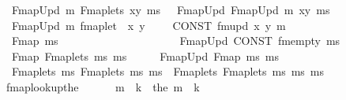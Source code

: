 \begin{isabellebody}
\isanewline
{}\isamarkupfalse%
\isanewline
\ \ {\isachardoublequoteopen}{\isacharunderscore}{\kern0pt}FmapUpd\ m\ {\isacharparenleft}{\kern0pt}{\isacharunderscore}{\kern0pt}Fmaplets\ xy\ ms{\isacharparenright}{\kern0pt}{\isachardoublequoteclose}\ \ {\isasymrightleftharpoons}\ {\isachardoublequoteopen}{\isacharunderscore}{\kern0pt}FmapUpd\ {\isacharparenleft}{\kern0pt}{\isacharunderscore}{\kern0pt}FmapUpd\ m\ xy{\isacharparenright}{\kern0pt}\ ms{\isachardoublequoteclose}\isanewline
\ \ {\isachardoublequoteopen}{\isacharunderscore}{\kern0pt}FmapUpd\ m\ {\isacharparenleft}{\kern0pt}{\isacharunderscore}{\kern0pt}fmaplet\ \ x\ y{\isacharparenright}{\kern0pt}{\isachardoublequoteclose}\ \ \ \ {\isasymrightleftharpoons}\ {\isachardoublequoteopen}CONST\ fmupd\ x\ y\ m{\isachardoublequoteclose}\isanewline
\ \ {\isachardoublequoteopen}{\isacharunderscore}{\kern0pt}Fmap\ ms{\isachardoublequoteclose}\ \ \ \ \ \ \ \ \ \ \ \ \ \ \ \ \ \ \ \ \ {\isasymrightleftharpoons}\ {\isachardoublequoteopen}{\isacharunderscore}{\kern0pt}FmapUpd\ {\isacharparenleft}{\kern0pt}CONST\ fmempty{\isacharparenright}{\kern0pt}\ ms{\isachardoublequoteclose}\isanewline
\ \ {\isachardoublequoteopen}{\isacharunderscore}{\kern0pt}Fmap\ {\isacharparenleft}{\kern0pt}{\isacharunderscore}{\kern0pt}Fmaplets\ ms{}\ ms{}{\isacharparenright}{\kern0pt}{\isachardoublequoteclose}\ \ \ \ \ {\isasymleftharpoondown}\ {\isachardoublequoteopen}{\isacharunderscore}{\kern0pt}FmapUpd\ {\isacharparenleft}{\kern0pt}{\isacharunderscore}{\kern0pt}Fmap\ ms{}{\isacharparenright}{\kern0pt}\ ms{}{\isachardoublequoteclose}\isanewline
\ \ {\isachardoublequoteopen}{\isacharunderscore}{\kern0pt}Fmaplets\ ms{}\ {\isacharparenleft}{\kern0pt}{\isacharunderscore}{\kern0pt}Fmaplets\ ms{}\ ms{}{\isacharparenright}{\kern0pt}{\isachardoublequoteclose}\ {\isasymleftharpoondown}\ {\isachardoublequoteopen}{\isacharunderscore}{\kern0pt}Fmaplets\ {\isacharparenleft}{\kern0pt}{\isacharunderscore}{\kern0pt}Fmaplets\ ms{}\ ms{}{\isacharparenright}{\kern0pt}\ ms{}{\isachardoublequoteclose}\isanewline
\isanewline
{}\isamarkupfalse%
\ fmap{\isacharunderscore}{\kern0pt}lookup{\isacharunderscore}{\kern0pt}the\ {\isacharparenleft}{\kern0pt}\ {\isacartoucheopen}{\isachardollar}{\kern0pt}{\isachardollar}{\kern0pt}{\isacharbang}{\kern0pt}{\isacartoucheclose}\ {}{}{}{\isacharparenright}{\kern0pt}\ \isanewline
\ \ {\isachardoublequoteopen}m\ {\isachardollar}{\kern0pt}{\isachardollar}{\kern0pt}{\isacharbang}{\kern0pt}\ k\ {\isasymequiv}\ the\ {\isacharparenleft}{\kern0pt}m\ {\isachardollar}{\kern0pt}{\isachardollar}{\kern0pt}\ k{\isacharparenright}{\kern0pt}{\isachardoublequoteclose}\isanewline

\end{isabellebody}
